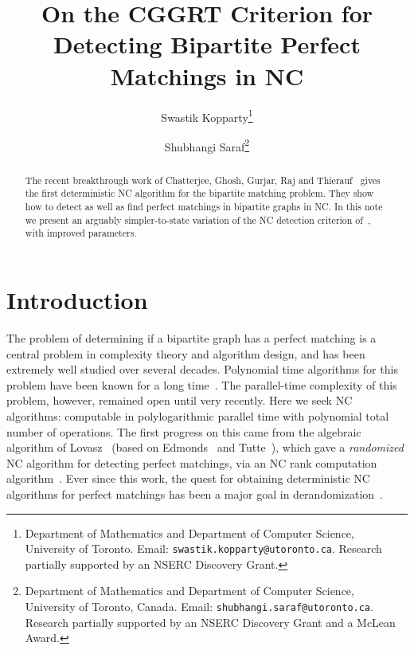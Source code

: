 \documentclass{article}
\begin{document}
\title{On the CGGRT Criterion for Detecting Bipartite Perfect Matchings in NC}
\author{Swastik Kopparty\thanks{Department of Mathematics and Department of Computer Science, University of Toronto. Email: \texttt{swastik.kopparty@utoronto.ca}.   Research partially supported
by an NSERC Discovery Grant.} \and Shubhangi Saraf\thanks{Department of Mathematics and Department of Computer Science, University of Toronto, Canada. Email: \texttt{shubhangi.saraf@utoronto.ca}.   Research partially supported
by an NSERC Discovery Grant and a McLean Award.}}
\date{}
\maketitle
\thispagestyle{empty}

\begin{abstract}
The recent breakthrough work of Chatterjee, Ghosh, Gurjar, Raj and Thierauf~\cite{CGGRT26} gives the first deterministic NC algorithm for the bipartite matching problem. They show how to detect as well as find perfect matchings in bipartite graphs in NC. In this note we present an arguably simpler-to-state variation of the NC detection criterion of~\cite{CGGRT26}, with improved parameters. 



\end{abstract}
\newpage
\setcounter{page}{1}

\section{Introduction}
The problem of determining if a bipartite graph has a perfect matching is a central problem in complexity theory and algorithm design, and has been extremely well studied over several decades. Polynomial time algorithms for this problem have been known for a long time~\cite{Kuh55, FF56, HK73}.
The parallel-time complexity of this problem, however, remained open until very recently. Here we seek NC algorithms: computable in polylogarithmic parallel time with polynomial total number of operations. The first progress on this came from the algebraic algorithm of Lovasz~\cite{Lov79} (based on Edmonds~\cite{Edm67} and Tutte~\cite{Tut47}), which gave a {\em randomized} NC algorithm for detecting perfect matchings, via an NC rank computation algorithm~\cite{Csa76, IMR80, Ber84, Mulmuley87}. Ever since this work, the quest for obtaining deterministic NC algorithms for perfect matchings has been a major goal in derandomization~\cite{GPV88, FGT19}.
\end{document}
